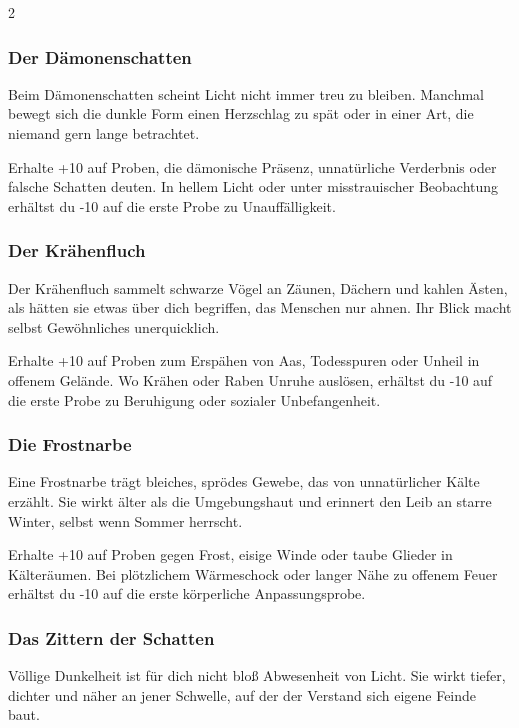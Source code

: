 {\begin{multicols*}{2}
        \subsubsection*{Der Dämonenschatten}
        Beim Dämonenschatten scheint Licht nicht immer treu zu bleiben. Manchmal bewegt sich die dunkle Form einen Herzschlag zu spät oder in einer Art, die niemand gern lange betrachtet.

        \malspielwertebox
        {Erhalte +10 auf Proben, die dämonische Präsenz, unnatürliche Verderbnis oder falsche Schatten deuten.}
        {In hellem Licht oder unter misstrauischer Beobachtung erhältst du -10 auf die erste Probe zu Unauffälligkeit.}

        \subsubsection*{Der Krähenfluch}
        Der Krähenfluch sammelt schwarze Vögel an Zäunen, Dächern und kahlen Ästen, als hätten sie etwas über dich begriffen, das Menschen nur ahnen. Ihr Blick macht selbst Gewöhnliches unerquicklich.

        \malspielwertebox
        {Erhalte +10 auf Proben zum Erspähen von Aas, Todesspuren oder Unheil in offenem Gelände.}
        {Wo Krähen oder Raben Unruhe auslösen, erhältst du -10 auf die erste Probe zu Beruhigung oder sozialer Unbefangenheit.}

        \subsubsection*{Die Frostnarbe}
        Eine Frostnarbe trägt bleiches, sprödes Gewebe, das von unnatürlicher Kälte erzählt. Sie wirkt älter als die Umgebungshaut und erinnert den Leib an starre Winter, selbst wenn Sommer herrscht.

        \malspielwertebox
        {Erhalte +10 auf Proben gegen Frost, eisige Winde oder taube Glieder in Kälteräumen.}
        {Bei plötzlichem Wärmeschock oder langer Nähe zu offenem Feuer erhältst du -10 auf die erste körperliche Anpassungsprobe.}

        \subsubsection*{Das Zittern der Schatten}
        Völlige Dunkelheit ist für dich nicht bloß Abwesenheit von Licht. Sie wirkt tiefer, dichter und näher an jener Schwelle, auf der der Verstand sich eigene Feinde baut.


\end{multicols*}}
